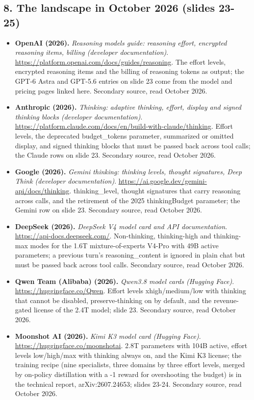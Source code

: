 \documentclass[11pt,letterpaper]{article}
\begin{document}
\subsection*{8. The landscape in October 2026 (slides 23-25)}
\begin{itemize}[leftmargin=1.2em,itemsep=3pt]\sloppy
\item \textbf{OpenAI (2026).} \textit{Reasoning models guide: reasoning effort, encrypted reasoning items, billing (developer documentation)}. \url{https://platform.openai.com/docs/guides/reasoning}. The effort levels, encrypted reasoning items and the billing of reasoning tokens as output; the GPT-6 Astra and GPT-5.6 entries on slide 23 come from the model and pricing pages linked here. Secondary source, read October 2026.
\item \textbf{Anthropic (2026).} \textit{Thinking: adaptive thinking, effort, display and signed thinking blocks (developer documentation)}. \url{https://platform.claude.com/docs/en/build-with-claude/thinking}. Effort levels, the deprecated budget\_tokens parameter, summarized or omitted display, and signed thinking blocks that must be passed back across tool calls; the Claude rows on slide 23. Secondary source, read October 2026.
\item \textbf{Google (2026).} \textit{Gemini thinking: thinking levels, thought signatures, Deep Think (developer documentation)}. \url{https://ai.google.dev/gemini-api/docs/thinking}. thinking\_level, thought signatures that carry reasoning across calls, and the retirement of the 2025 thinkingBudget parameter; the Gemini row on slide 23. Secondary source, read October 2026.
\item \textbf{DeepSeek (2026).} \textit{DeepSeek V4 model card and API documentation}. \url{https://api-docs.deepseek.com/}. Non-thinking, thinking-high and thinking-max modes for the 1.6T mixture-of-experts V4-Pro with 49B active parameters; a previous turn's reasoning\_content is ignored in plain chat but must be passed back across tool calls. Secondary source, read October 2026.
\item \textbf{Qwen Team (Alibaba) (2026).} \textit{Qwen3.8 model cards (Hugging Face)}. \url{https://huggingface.co/Qwen}. Effort levels xhigh/medium/low with thinking that cannot be disabled, preserve-thinking on by default, and the revenue-gated license of the 2.4T model; slide 23. Secondary source, read October 2026.
\item \textbf{Moonshot AI (2026).} \textit{Kimi K3 model card (Hugging Face)}. \url{https://huggingface.co/moonshotai}. 2.8T parameters with 104B active, effort levels low/high/max with thinking always on, and the Kimi K3 license; the training recipe (nine specialists, three domains by three effort levels, merged by on-policy distillation with a -1 reward for overshooting the budget) is in the technical report, arXiv:2607.24653; slides 23-24. Secondary source, read October 2026.

\end{itemize}
\end{document}
